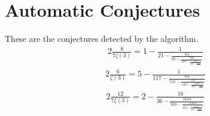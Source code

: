 \documentclass{article}%
\begin{document}
%
\normalsize%
\section{Automatic Conjectures}%
\label{sec:AutomaticConjectures}%
These are the conjectures detected by the algorithm.%
\begin{alignat*}{2}%
\frac{8}{7 \zeta\left(3\right)} = 1 - \frac{1}{21 - \frac{64}{95 - \frac{729}{259 - \frac{4096}{549 - \frac{15625}{..}}}}}%
\end{alignat*}%
\begin{alignat*}{2}%
\frac{6}{\zeta\left(3\right)} = 5 - \frac{1}{117 - \frac{64}{535 - \frac{729}{1463 - \frac{4096}{3105 - \frac{15625}{..}}}}}%
\end{alignat*}%
\begin{alignat*}{2}%
\frac{12}{7 \zeta\left(3\right)} = 2 - \frac{16}{36 - \frac{1024}{160 - \frac{11664}{434 - \frac{65536}{918 - \frac{250000}{..}}}}}%
\end{alignat*}

%
\end{document}
